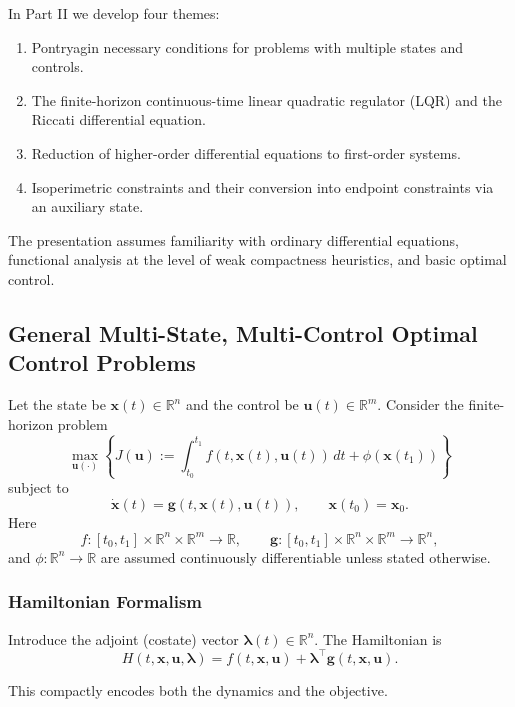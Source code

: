 \documentclass[11pt]{article}
\theoremstyle{definition}
\newcommand{\R}{\mathbb{R}}
\newcommand{\x}{\bm{x}}
\newcommand{\uvec}{\bm{u}}
\newcommand{\lam}{\bm{\lambda}}
\newcommand{\gvec}{\bm{g}}
\begin{document}
In Part II we develop four themes:

\begin{enumerate}[label=(\roman*)]
    \item Pontryagin necessary conditions for problems with multiple states and controls.
    \item The finite-horizon continuous-time linear quadratic regulator (LQR) and the Riccati differential equation.
    \item Reduction of higher-order differential equations to first-order systems.
    \item Isoperimetric constraints and their conversion into endpoint constraints via an auxiliary state.
\end{enumerate}

The presentation assumes familiarity with ordinary differential equations, functional analysis at the level of weak compactness heuristics, and basic optimal control.

\subsection{General Multi-State, Multi-Control Optimal Control Problems}

Let the state be $\x(t)\in\R^n$ and the control be $\uvec(t)\in\R^m$. Consider the finite-horizon problem
\begin{equation}
\max_{\uvec(\cdot)} \left\{
J(\uvec):=\int_{t_0}^{t_1} f(t,\x(t),\uvec(t))\,dt + \phi(\x(t_1))
\right\}
\end{equation}
subject to
\begin{equation}
\dot{\x}(t)=\gvec(t,\x(t),\uvec(t)), \qquad \x(t_0)=\x_0.
\end{equation}
Here
\[
f:[t_0,t_1]\times\R^n\times\R^m\to\R,\qquad
\gvec:[t_0,t_1]\times\R^n\times\R^m\to\R^n,
\]
and $\phi:\R^n\to\R$ are assumed continuously differentiable unless stated otherwise.

\subsubsection{Hamiltonian Formalism}

Introduce the adjoint (costate) vector $\lam(t)\in\R^n$. The Hamiltonian is
\begin{equation}
H(t,\x,\uvec,\lam)=f(t,\x,\uvec)+\lam^\top \gvec(t,\x,\uvec).
\end{equation}

This compactly encodes both the dynamics and the objective.
\end{document}
